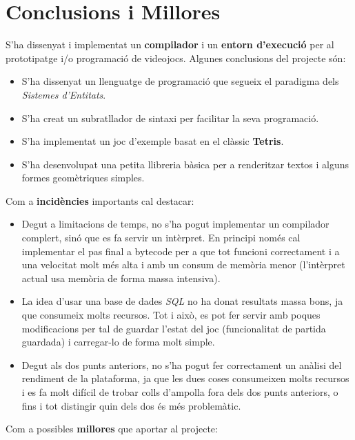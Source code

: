 \chapter{Conclusions i Millores}
\label{chap:Conclusions}

S'ha dissenyat i implementat un {\bf compilador} i un {\bf entorn d'execució} per al prototipatge i/o programació de videojocs. Algunes conclusions del projecte són:

\begin{itemize}
  \item S'ha dissenyat un llenguatge de programació que segueix el paradigma dels {\em Sistemes d'Entitats}.
  \item S'ha creat un subratllador de sintaxi per facilitar la seva programació.
  \item S'ha implementat un joc d'exemple basat en el clàssic {\bf Tetris}.
  \item S'ha desenvolupat una petita llibreria bàsica per a renderitzar textos i alguns formes geomètriques simples.
\end{itemize}

Com a {\bf incidències} importants cal destacar:

\begin{itemize}
  \item Degut a limitacions de temps, no s'ha pogut implementar un compilador complert, sinó que es fa servir un intèrpret. En principi només cal implementar el pas final a bytecode per a que tot funcioni correctament i a una velocitat molt més alta i amb un consum de memòria menor (l'intèrpret actual usa memòria de forma massa intensiva).
  \item La idea d'usar una base de dades {\em SQL} no ha donat resultats massa bons, ja que consumeix molts recursos. Tot i això, es pot fer servir amb poques modificacions per tal de guardar l'estat del joc (funcionalitat de partida guardada) i carregar-lo de forma molt simple.
  \item Degut als dos punts anteriors, no s'ha pogut fer correctament un anàlisi del rendiment de la plataforma, ja que les dues coses consumeixen molts recursos i es fa molt difícil de trobar colls d'ampolla fora dels dos punts anteriors, o fins i tot distingir quin dels dos és més problemàtic.
\end{itemize}

Com a possibles {\bf millores} que aportar al projecte:


